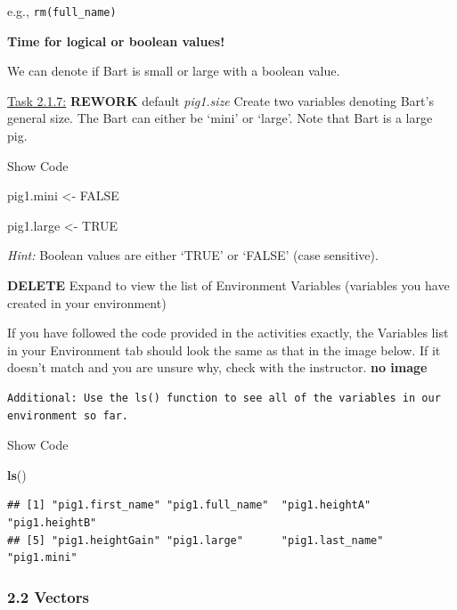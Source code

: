\documentclass[
]{article}
\newenvironment{Shaded}{\begin{snugshade}}{\end{snugshade}}
\newcommand{\ConstantTok}[1]{\textcolor[rgb]{0.56,0.35,0.01}{#1}}
\newcommand{\FunctionTok}[1]{\textcolor[rgb]{0.13,0.29,0.53}{\textbf{#1}}}
\newcommand{\NormalTok}[1]{#1}
\newcommand{\OtherTok}[1]{\textcolor[rgb]{0.56,0.35,0.01}{#1}}
\begin{document}
e.g., \texttt{rm(full\_name)}

\textbf{Time for logical or boolean values!}

We can denote if Bart is small or large with a boolean value.

\ul{Task 2.1.7:} \textbf{REWORK} default \emph{pig1.size} Create two
variables denoting Bart's general size. The Bart can either be `mini' or
`large'. Note that Bart is a large pig.

Show Code

\begin{Shaded}
\begin{Highlighting}[]
\NormalTok{pig1.mini }\OtherTok{\textless{}{-}} \ConstantTok{FALSE}

\NormalTok{pig1.large }\OtherTok{\textless{}{-}} \ConstantTok{TRUE}
\end{Highlighting}
\end{Shaded}

\emph{Hint:} Boolean values are either `TRUE' or `FALSE' (case
sensitive).

\textbf{DELETE} Expand to view the list of Environment Variables
(variables you have created in your environment)

If you have followed the code provided in the activities exactly, the
Variables list in your Environment tab should look the same as that in
the image below. If it doesn't match and you are unsure why, check with
the instructor. \textbf{no image}

\begin{verbatim}
Additional: Use the ls() function to see all of the variables in our environment so far.
\end{verbatim}

Show Code

\begin{Shaded}
\begin{Highlighting}[]
\FunctionTok{ls}\NormalTok{()}
\end{Highlighting}
\end{Shaded}

\begin{verbatim}
## [1] "pig1.first_name" "pig1.full_name"  "pig1.heightA"    "pig1.heightB"   
## [5] "pig1.heightGain" "pig1.large"      "pig1.last_name"  "pig1.mini"
\end{verbatim}

\hypertarget{vectors}{%
\subsubsection{2.2 Vectors}\label{vectors}}
\end{document}
